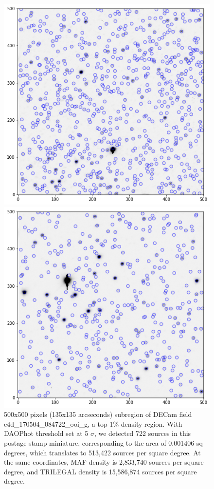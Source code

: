 \documentclass[DM,lsstdraft,toc,usenatbib]{lsstdoc}
\begin{document}
\begin{figure}
\begin{minipage}[t]{0.5\linewidth}
\includegraphics[width=\linewidth]{figs/c4d_170504_084722_ooi_g_v1_1_sub_500px.png}
\caption{500x500 pixels (135x135 arcseconds)  subregion of DECam field c4d\_170504\_084722\_ooi\_g,
a top 1\% density region. With DAOPhot threshold set at 5 $\sigma$,  we detected 722 sources in this postage stamp miniature, corresponding to the area of 0.001406 sq degrees, which translates to 513,422 sources per square degree. At the same coordinates, MAF density is 2,833,740 sources per square degree, and TRILEGAL density is 15,586,874 sources per square degree. }
\label{fig:decam_1_perc_miniature}
\end{minipage}
\hfill
\begin{minipage}[t]{0.5\linewidth}
\includegraphics[width=\linewidth]{figs/c4d_170429_035748_ooi_g_v1_1_sub_500px.png}

\end{minipage}
\end{figure}
\end{document}
